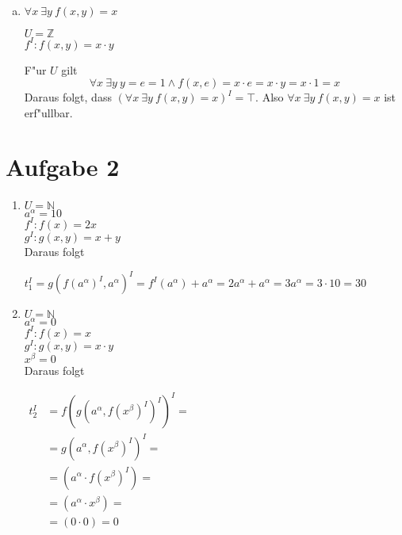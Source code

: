 \documentclass[10pt, oneside]{article}
\begin{document}
\begin{enumerate}[(a)]
    \item $\forall x \ \exists y\ f(x, y) = x$

        $U = \mathbb{Z}$ \\[5pt]
        $f^I : f(x, y) = x \cdot y$

        F"ur $U$ gilt
        \begin{equation*}
            \forall x \ \exists y\  y = e = 1 \land f(x, e) = x \cdot e = x \cdot y = x \cdot 1 = x
        \end{equation*}
        Daraus folgt, dass $(\forall x \ \exists y\ f(x, y) = x)^I = \top$.
        Also $\forall x \ \exists y\ f(x, y) = x$ ist erf"ullbar.

\end{enumerate}

\section{Aufgabe 2}

\begin{enumerate}
    \item
        $U = \mathbb{N}$ \\[5pt]
        $a^{\alpha} = 10$ \\[5pt]
        $f^I : f(x) = 2x$ \\[5pt]
        $g^I : g(x, y) = x + y$ \\[5pt]

        Daraus folgt

        $t_1^I = g(f(a^{\alpha})^I, a^{\alpha})^I = f^I(a^{\alpha}) + a^{\alpha} = 2a^{\alpha} + a^{\alpha} = 3a^{\alpha} = 3 \cdot 10 = 30$ \\[5pt]

    \item
        $U = \mathbb{N}$ \\[5pt]
        $a^{\alpha} = 0$ \\[5pt]
        $f^I : f(x) = x$ \\[5pt]
        $g^I : g(x, y) = x \cdot y$ \\[5pt]
        $x^{\beta} = 0$ \\[5pt]

        Daraus folgt

        $\begin{aligned}
            t_2^I &= f(g(a^{\alpha}, f(x^{\beta})^I)^I)^I = \\
                  &= g(a^{\alpha}, f(x^{\beta})^I)^I = \\
                  &= (a^{\alpha} \cdot f(x^{\beta})^{I}) = \\
                  &= (a^{\alpha} \cdot x^{\beta}) = \\
                  &= (0 \cdot 0) = 0
        \end{aligned}$
\end{enumerate}
\end{document}
